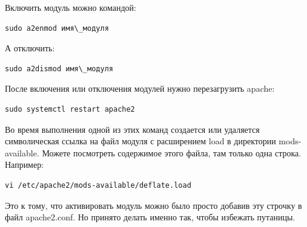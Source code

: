 \documentclass[14pt, a4paper]{article}
\begin{document}
Включить модуль можно командой:
\begin{lstlisting}
sudo a2enmod имя\_модуля
\end{lstlisting}

А отключить:
\begin{lstlisting}
sudo a2dismod имя\_модуля
\end{lstlisting}

После включения или отключения модулей нужно перезагрузить apache:
\begin{lstlisting}
sudo systemctl restart apache2
\end{lstlisting}

Во время выполнения одной из этих команд создается или удаляется символическая ссылка на 
файл модуля с расширением load в директории mods-available. Можете посмотреть содержимое 
этого файла, там только одна строка. Например:
\begin{lstlisting}
vi /etc/apache2/mods-available/deflate.load
\end{lstlisting}
\begin{figure}[H]%
    \centering
    \label{1.9}
\end{figure}
Это к тому, что активировать модуль можно было просто добавив эту строчку в файл apache2.conf.
Но принято делать именно так, чтобы избежать путаницы.
\end{document}
